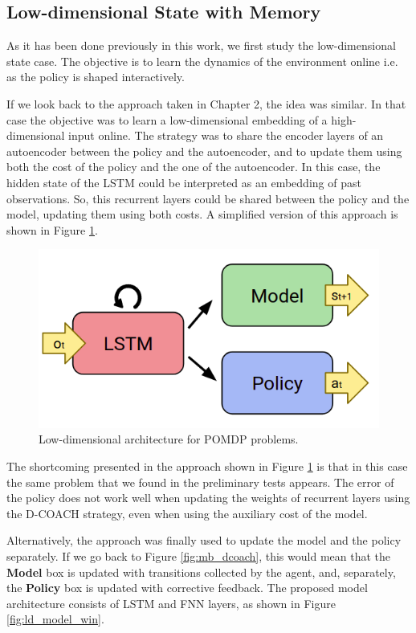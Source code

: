 \subsection{Low-dimensional State with Memory}
As it has been done previously in this work, we first study the low-dimensional state case. The objective is to learn the dynamics of the environment online i.e. as the policy is shaped interactively. 

If we look back to the approach taken in Chapter 2, the idea was similar. In that case the objective was to learn a low-dimensional embedding of a high-dimensional input online. The strategy was to share the encoder layers of an autoencoder between the policy and the autoencoder, and to update them using both the cost of the policy and the one of the autoencoder. In this case, the hidden state of the LSTM could be interpreted as an embedding of past observations. So, this recurrent layers could be shared between the policy and the model, updating them using both costs. A simplified version of this approach is shown in Figure \ref{fig:ld_model_rip}.

\begin{figure}[h]
    \centering
    \includegraphics[width=0.6\linewidth]{imagenes/cap4/ld_model_rip.png}
    \caption{Low-dimensional architecture for POMDP problems.}
    \label{fig:ld_model_rip}
\end{figure}

The shortcoming presented in the approach shown in Figure \ref{fig:ld_model_rip} is that in this case the same problem that we found in the preliminary tests appears. The error of the policy does not work well when updating the weights of recurrent layers using the D-COACH strategy, even when using the auxiliary cost of the model. 

Alternatively, the approach was finally used to update the model and the policy separately. If we go back to Figure \ref{fig:mb_dcoach}, this would mean that the \textbf{Model} box is updated with transitions collected by the agent, and, separately, the \textbf{Policy} box is updated with corrective feedback. The proposed model architecture consists of LSTM and FNN layers, as shown in Figure \ref{fig:ld_model_win}.

